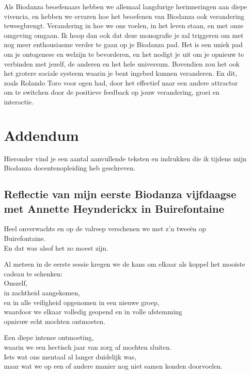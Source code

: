 \documentclass[
  11pt,
]{book}
\begin{document}
Als Biodanza beoefenaars hebben we allemaal langdurige herinneringen aan diepe vivencia, en hebben we ervaren hoe het beoefenen van Biodanza ook verandering teweegbrengt. Verandering in hoe we ons voelen, in het leven staan, en met onze omgeving omgaan.
Ik hoop dan ook dat deze monografie je zal triggeren om met nog meer enthousiasme verder te gaan op je Biodanza pad. Het is een uniek pad om je ontogenese en welzijn te bevorderen, en het nodigt je uit om je opnieuw te verbinden met jezelf, de anderen en het hele universum. Bovendien zou het ook het grotere sociale systeem waarin je bent ingebed kunnen veranderen. En dit, zoals Rolando Toro voor ogen had, door het effectief naar een andere attractor om te switchen door de positieve feedback op jouw verandering, groei en interactie.

\chapter*{Addendum}\label{addendum}

Hieronder vind je een aantal aanvullende teksten en indrukken die ik tijdens mijn Biodanza docentenopleiding heb geschreven.

\section*{Reflectie van mijn eerste Biodanza vijfdaagse met Annette Heynderickx in Buirefontaine}\label{reflectie-van-mijn-eerste-biodanza-vijfdaagse-met-annette-heynderickx-in-buirefontaine}

Heel onverwachts en op de valreep verschenen we met z'n tweeën op Buirefontaine.\\
En dat was alsof het zo moest zijn.

Al meteen in de eerste sessie kregen we de kans om elkaar als koppel het mooiste cadeau te schenken:\\
Onszelf,\\
in zachtheid aangekomen,\\
en in alle veiligheid opgenomen in een nieuwe groep,\\
waardoor we elkaar volledig geopend en in volle afstemming\\
opnieuw echt mochten ontmoeten.

Een diepe intense ontmoeting,\\
waarin we een hectisch jaar van zorg af mochten sluiten.\\
Iets wat ons mentaal al langer duidelijk was,\\
maar wat we op een of andere manier nog niet samen konden doorvoelen.
\end{document}
